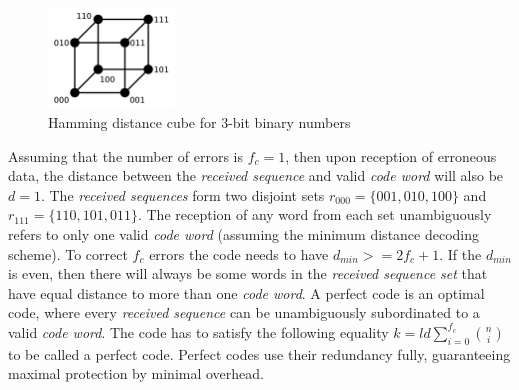 \begin{figure}[H]
\centering
\includegraphics[width=0.3\textwidth]{figures/Hamming_distance.png}
\caption{Hamming distance cube for 3-bit binary numbers~\cite{web:hamming_dist}}
\label{fig:hamming_dist}
\end{figure}

Assuming that the number of errors is $f_c = 1$, then upon reception of erroneous data, the distance between the \textit{received sequence} and valid \textit{code word} will also be $d = 1$. The \textit{received sequences} form two disjoint sets $r_{000}=\{001,010,100\}$ and $r_{111}=\{110,101,011\}$. The reception of any word from each set unambiguously refers to only one valid \textit{code word} (assuming the minimum distance decoding scheme). To correct $f_c$ errors the code needs to have $d_{min} >= 2f_c+1$. If the $d_{min}$ is even, then there will always be some words in the \textit{received sequence set} that have equal distance to more than one \textit{code word}. A perfect code is an optimal code, where every \textit{received sequence} can be unambiguously subordinated to a valid \textit{code word}. The code has to satisfy the following equality $k=ld\sum_{i=0}^{f_c} {n \choose i}$ to be called a perfect code. Perfect codes use their redundancy fully, guaranteeing maximal protection by minimal overhead.

